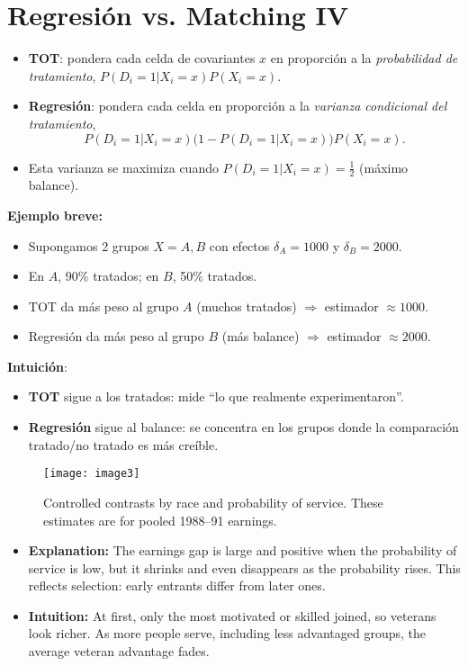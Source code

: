 \documentclass[12pt]{article}
\begin{document}
\section*{\noindent\textbf{Regresión vs. Matching IV}}

\begin{itemize}
    \item \textbf{TOT}: pondera cada celda de covariantes $x$ en proporción a la \textit{probabilidad de tratamiento}, $P(D_i=1|X_i=x)P(X_i=x)$.
    \item \textbf{Regresión}: pondera cada celda en proporción a la \textit{varianza condicional del tratamiento}, 
    \[
    P(D_i=1|X_i=x)\big(1-P(D_i=1|X_i=x)\big)P(X_i=x).
    \]
    \item Esta varianza se maximiza cuando $P(D_i=1|X_i=x)=\tfrac{1}{2}$ (máximo balance).
\end{itemize}

\textbf{Ejemplo breve:}  
\begin{itemize}
    \item Supongamos 2 grupos $X=A,B$ con efectos $\delta_A=1000$ y $\delta_B=2000$.
    \item En $A$, 90\% tratados; en $B$, 50\% tratados.
    \item TOT da más peso al grupo $A$ (muchos tratados) $\Rightarrow$ estimador $\approx 1000$.
    \item Regresión da más peso al grupo $B$ (más balance) $\Rightarrow$ estimador $\approx 2000$.
\end{itemize}

\textbf{Intuición}:  
\begin{itemize}
    \item \textbf{TOT} sigue a los tratados: mide “lo que realmente experimentaron”.
    \item \textbf{Regresión} sigue al balance: se concentra en los grupos donde la comparación tratado/no tratado es más creíble.
\end{itemize}

\begin{figure}[H]
    \centering
    \texttt{[image: image3]}
    \caption{\footnotesize Controlled contrasts by race and probability of service. 
    These estimates are for pooled 1988--91 earnings.}
    \label{fig:contrasts_prob_service}
\end{figure}

\begin{itemize}
    \item \textbf{Explanation:} The earnings gap is large and positive when the probability of service is low, but it shrinks and even disappears as the probability rises. This reflects selection: early entrants differ from later ones. 
    \item \textbf{Intuition:} At first, only the most motivated or skilled joined, so veterans look richer. As more people serve, including less advantaged groups, the average veteran advantage fades.
\end{itemize}
\end{document}
